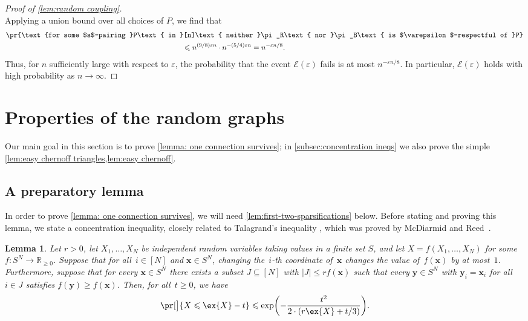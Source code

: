 \documentclass[11pt,reqno,oneside]{amsart}
\newtheorem{lemma}[theorem]{Lemma}
\theoremstyle{definition}
\newcommand\1{\mathbf{1}}
\newcommand{\cE}{\mathcal{E}}
\newcommand{\bR}{\mathbb{R}}
\DeclarePairedDelimiter{\paren}{\lparen}{\rparen}
\newcommand{\eps}{\varepsilon}
\let\leq\leqslant
\let\le\leqslant
\let\ge\geqslant
\begin{document}
\begin{proof}[Proof of \cref{lem:random coupling}]
\[	\]
	Applying a union bound over all choices of $P$, we find that
    \begin{align*}
    &\pr{\text{for some $s$-pairing }P\text{ in }[n]\text{ neither }\pi_R\text{ nor }\pi_B\text{ is $\eps$-respectful of }P}\\
    &\qquad\qquad\qquad\qquad\qquad\qquad\qquad\qquad\qquad\qquad\qquad\qquad\leq n^{(9/8)\eps n}\cdot n^{-(5/4)\eps n}=n^{-\eps n/8}.
    \end{align*}
    Thus, for $n$ sufficiently large with respect to $\eps$, the probability that the event $\cE(\eps)$ fails is at most $n^{-\eps n/8}$. In particular, $\cE(\eps)$ holds with high probability as $n\to \infty$.
\end{proof}


\section{Properties of the random graphs}\label{sec:connection survives}
Our main goal in this section is to prove \cref{lemma: one connection survives}; in \cref{subsec:concentration ineqs} we also prove the simple \cref{lem:easy chernoff triangles,lem:easy chernoff}.


\subsection{A preparatory lemma}
In order to prove \cref{lemma: one connection survives}, we will need \cref{lem:first-two-sparsifications} below. Before stating and proving this lemma,
we state a concentration inequality, closely related to Talagrand's inequality \cite{MR1361756}, which was proved by McDiarmid and Reed~\cite[Theorem~2]{MR2268235}. 

\begin{lemma}\label{lemma: talagrand}
Let $r>0$, let $X_1,\ldots,X_N$ be independent random variables taking values in a finite set $S$, and let $X=f(X_1,\ldots,X_N)$ for some $f\colon S^N\to\bR_{\ge 0}$. Suppose that for all~$i\in [N]$ and $\mathbf{x}\in S^N$, changing the~$i$-th coordinate of~$\mathbf{x}$ changes the value of~$f(\mathbf{x})$ by at most~$1$. Furthermore, suppose that for every $\mathbf{x}\in S^N$ there exists a subset $J\subseteq [N]$ with $|J|\le rf(\mathbf{x})$ such that every $\mathbf{y}\in S^N$ with $\mathbf{y}_i=\mathbf{x}_i$ for all $i\in J$ satisfies $f(\mathbf{y})\ge f(\mathbf{x})$. Then, for all~$t\ge 0$, we have
  \begin{equation*}
    \pr[\big]{X\leq \ex{X}-t}\leq \exp\paren[\bigg]{-\frac{t^2}{2\cdot (r\ex{X}+t/3)}}.
  \end{equation*}
\end{lemma}
\end{document}
